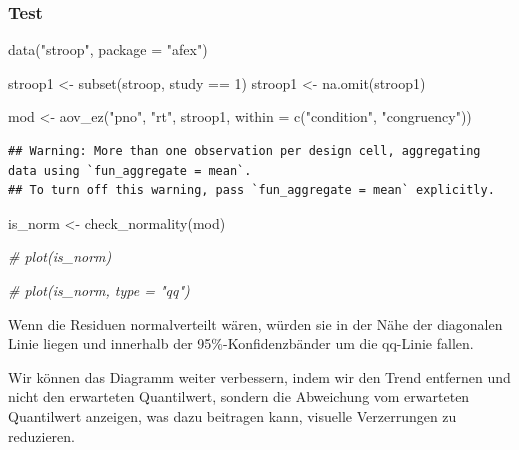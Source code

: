 \documentclass[
]{book}
\newenvironment{Shaded}{\begin{snugshade}}{\end{snugshade}}
\newcommand{\AttributeTok}[1]{\textcolor[rgb]{0.77,0.63,0.00}{#1}}
\newcommand{\CommentTok}[1]{\textcolor[rgb]{0.56,0.35,0.01}{\textit{#1}}}
\newcommand{\DecValTok}[1]{\textcolor[rgb]{0.00,0.00,0.81}{#1}}
\newcommand{\FunctionTok}[1]{\textcolor[rgb]{0.00,0.00,0.00}{#1}}
\newcommand{\NormalTok}[1]{#1}
\newcommand{\OtherTok}[1]{\textcolor[rgb]{0.56,0.35,0.01}{#1}}
\newcommand{\SpecialCharTok}[1]{\textcolor[rgb]{0.00,0.00,0.00}{#1}}
\newcommand{\StringTok}[1]{\textcolor[rgb]{0.31,0.60,0.02}{#1}}
\begin{document}
\hypertarget{test-2}{%
\subsubsection{Test}\label{test-2}}

\begin{Shaded}
\begin{Highlighting}[]
\FunctionTok{data}\NormalTok{(}\StringTok{"stroop"}\NormalTok{, }\AttributeTok{package =} \StringTok{"afex"}\NormalTok{)}

\NormalTok{stroop1 }\OtherTok{\textless{}{-}} \FunctionTok{subset}\NormalTok{(stroop, study }\SpecialCharTok{==} \DecValTok{1}\NormalTok{)}
\NormalTok{stroop1 }\OtherTok{\textless{}{-}} \FunctionTok{na.omit}\NormalTok{(stroop1)}

\NormalTok{mod }\OtherTok{\textless{}{-}} \FunctionTok{aov\_ez}\NormalTok{(}\StringTok{"pno"}\NormalTok{, }\StringTok{"rt"}\NormalTok{, stroop1,}
             \AttributeTok{within =} \FunctionTok{c}\NormalTok{(}\StringTok{"condition"}\NormalTok{, }\StringTok{"congruency"}\NormalTok{))}
\end{Highlighting}
\end{Shaded}

\begin{verbatim}
## Warning: More than one observation per design cell, aggregating data using `fun_aggregate = mean`.
## To turn off this warning, pass `fun_aggregate = mean` explicitly.
\end{verbatim}

\begin{Shaded}
\begin{Highlighting}[]
\NormalTok{is\_norm }\OtherTok{\textless{}{-}} \FunctionTok{check\_normality}\NormalTok{(mod)}

\CommentTok{\# plot(is\_norm)}
\end{Highlighting}
\end{Shaded}

\begin{Shaded}
\begin{Highlighting}[]
\CommentTok{\# plot(is\_norm, type = "qq")}
\end{Highlighting}
\end{Shaded}

Wenn die Residuen normalverteilt wären, würden sie in der Nähe der diagonalen Linie liegen und innerhalb der 95\%-Konfidenzbänder um die qq-Linie fallen.

Wir können das Diagramm weiter verbessern, indem wir den Trend entfernen und nicht den erwarteten Quantilwert, sondern die Abweichung vom erwarteten Quantilwert anzeigen, was dazu beitragen kann, visuelle Verzerrungen zu reduzieren.
\end{document}

